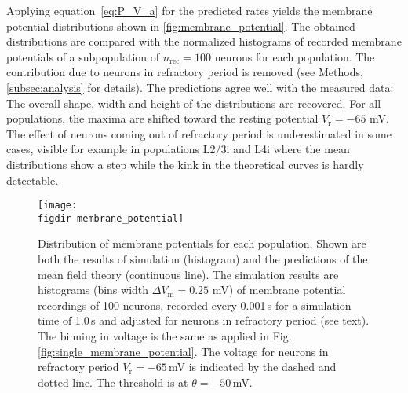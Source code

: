 Applying equation~\eqref{eq:P_V_a} for the predicted rates yields the 
membrane potential distributions shown in 
\autoref{fig:membrane_potential}. 
The obtained distributions are compared with the normalized histograms of recorded 
membrane potentials of a subpopulation of $n_\text{rec} = 100$ neurons for 
each population. The contribution due to neurons in refractory period is removed
(see Methods, \autoref{subsec:analysis} for details). 
The predictions agree well with the measured data: The overall shape, width and 
height of the distributions are recovered. For all populations, the maxima are
shifted toward the resting potential $V_\text{r} = -65$ mV. 
The effect
of neurons coming out of refractory period is underestimated in some cases, 
visible for example in populations L2/3i and L4i where the mean distributions 
show a step while the kink in the theoretical curves is hardly detectable. 

\begin{figure}[tb]
    \centering
    \texttt{[image: \\figdir membrane\_potential]}
    \caption[Distribution of membrane potentials]{
        Distribution of membrane potentials for each population. 
        Shown are both the results of simulation (histogram) and 
        the predictions of the mean field theory (continuous line). 
        The simulation results are histograms (bins width $\Delta V_\text{m} = 0.25$ mV) 
        of membrane potential recordings 
        of 100 neurons, recorded every 0.001\,s for a simulation time of 1.0\,s 
        and adjusted for neurons in refractory period (see text). 
        The binning in voltage is the same as applied in Fig.~%
        \autoref{fig:single_membrane_potential}. 
        The voltage for neurons in refractory period $V_\text{r} = -65$\,mV 
        is indicated by the dashed and dotted line. The threshold is at 
        $\theta = -50$\,mV. 
    }
    \label{fig:membrane_potential}
\end{figure}

